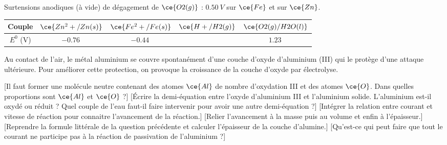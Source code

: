     Surtensions anodiques (à vide) de dégagement de $\ce{O2(g)}$ : $\SI{0,50}{V}$ sur $\ce{Fe}$ et sur $\ce{Zn}$.
    \begin{table}[!h]
      \centering
      \begin{tabular}{|c|c|c|c|c|}
        \hline
        Couple & $\ce{Zn^2+/Zn(s)}$ & $\ce{Fe^2+/Fe(s)}$ & $\ce{H+/H2(g)}$ & $\ce{O2(g)/H2O(l)}$\\
        \hline
        $E^0$ (V) & $\SI{-0.76}{}$ & $\SI{-0.44}{}$ &  & $\SI{1.23}{}$\\
        \hline
      \end{tabular}
    \end{table}
    
    Au contact de l'air, le métal aluminium se couvre spontanément d'une couche d'oxyde d'aluminium (III) qui le protège d'une attaque ultérieure. Pour améliorer cette protection, on provoque la croissance de la couche d'oxyde par électrolyse.
    \begin{enumerate}
        [Il faut former une molécule neutre contenant des atomes $\ce{Al}$ de nombre d'oxydation III et des atomes $\ce{O}$. Dans quelles proportions sont $\ce{Al}$ et $\ce{O}$ ?]
        [Écrire la demi-équation entre l'oxyde d'aluminium III et l'aluminium solide. L'aluminium est-il oxydé ou réduit ? Quel couple de l'eau faut-il faire intervenir pour avoir une autre demi-équation ?]
        [Intégrer la relation entre courant et vitesse de réaction pour connaitre l'avancement de la réaction.]
        [Relier l'avancement à la masse puis au volume et enfin à l'épaisseur.]
        [Reprendre la formule littérale de la question précédente et calculer l'épaisseur de la couche d'alumine.]
        [Qu'est-ce qui peut faire que tout le courant ne participe pas à la réaction de passivation de l'aluminium ?]
    \end{enumerate}
